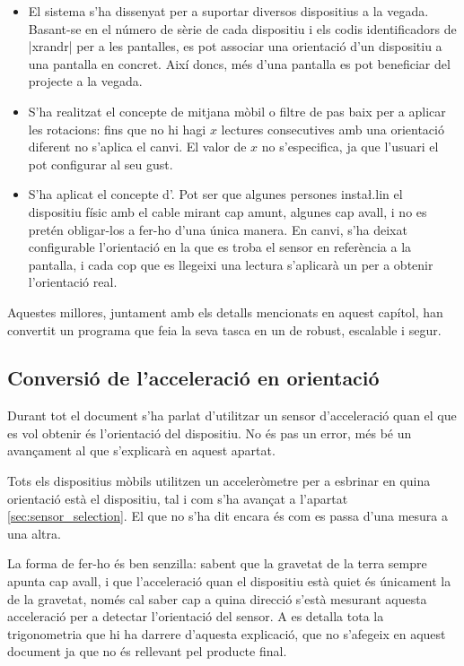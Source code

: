 \begin{itemize}
    \item El sistema s'ha dissenyat per a suportar diversos dispositius a la
    vegada. Basant-se en el número de sèrie de cada dispositiu i els codis
    identificadors de \ord|xrandr| per a les pantalles, es pot associar una
    orientació d'un dispositiu a una pantalla en concret. Així doncs, més
    d'una pantalla es pot beneficiar del projecte a la vegada.
    \item S'ha realitzat el concepte de mitjana mòbil o filtre de pas baix per
    a aplicar les rotacions: fins que no hi hagi $x$ lectures consecutives amb
    una orientació diferent no s'aplica el canvi. El valor de $x$ no
    s'especifica, ja que l'usuari el pot configurar al seu gust.
    \item S'ha aplicat el concepte d'. Pot ser que algunes persones
    insta\l.lin el dispositiu físic amb el cable mirant cap amunt, algunes cap
    avall, i no es pretén obligar-los a fer-ho d'una única manera. En canvi,
    s'ha deixat configurable l'orientació en la que es troba el sensor en
    referència a la pantalla, i cada cop que es llegeixi una lectura s'aplicarà
    un  per a obtenir l'orientació real.
\end{itemize}

Aquestes millores, juntament amb els detalls mencionats en aquest capítol, han
convertit un programa que feia la seva tasca en un de robust, escalable i segur.

\subsection{Conversió de l'acceleració en orientació}

Durant tot el document s'ha parlat d'utilitzar un sensor d'acceleració quan el
que es vol obtenir és l'orientació del dispositiu. No és pas un error, més bé
un avançament al que s'explicarà en aquest apartat.

Tots els dispositius mòbils utilitzen un acceleròmetre per a esbrinar en quina
orientació està el dispositiu, tal i com s'ha avançat a l'apartat
\ref{sec:sensor_selection}. El que no s'ha dit encara és com es passa d'una
mesura a una altra.

La forma de fer-ho és ben senzilla: sabent que la gravetat de la terra sempre
apunta cap avall, i que l'acceleració quan el dispositiu està quiet és únicament
la de la gravetat, només cal saber cap a quina direcció s'està mesurant aquesta
acceleració per a detectar l'orientació del sensor. A \cite{PedleyTilt} es
detalla tota la
trigonometria que hi ha darrere d'aquesta explicació, que no s'afegeix en aquest
document ja que no és rellevant pel producte final.

